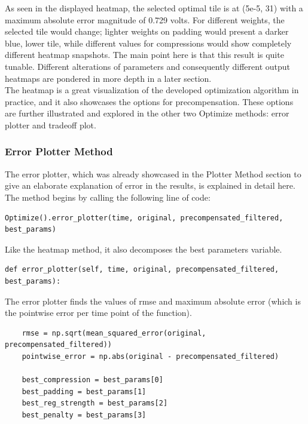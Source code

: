 \documentclass[11pt, a4paper]{article}
\theoremstyle{definition}
\numberwithin{equation}{section}
\begin{document}
As seen in the displayed heatmap, the selected optimal tile is at (5e-5, 31) with a maximum absolute error magnitude of 0.729 volts. For different weights, the selected tile would change; lighter weights on padding would present a darker blue, lower tile, while different values for compressions would show completely different heatmap snapshots. The main point here is that this result is quite tunable. Different alterations of parameters and consequently different output heatmaps are pondered in more depth in a later section.
\\
The heatmap is a great visualization of the developed optimization algorithm in practice, and it also showcases the options for precompensation. These options are further illustrated and explored in the other two Optimize methods: error plotter and tradeoff plot.

\subsubsection{Error Plotter Method}

The error plotter, which was already showcased in the Plotter Method section to give an elaborate explanation of error in the results, is explained in detail here.
\\
The method begins by calling the following line of code:

\begin{verbatim}
Optimize().error_plotter(time, original, precompensated_filtered, best_params)
\end{verbatim}

Like the heatmap method, it also decomposes the best parameters variable.

\begin{verbatim}
def error_plotter(self, time, original, precompensated_filtered, best_params):
\end{verbatim}

The error plotter finds the values of rmse and maximum absolute error (which is the pointwise error per time point of the function).

\begin{verbatim}
    rmse = np.sqrt(mean_squared_error(original, precompensated_filtered))
    pointwise_error = np.abs(original - precompensated_filtered)
            
    best_compression = best_params[0]
    best_padding = best_params[1]
    best_reg_strength = best_params[2]
    best_penalty = best_params[3]
\end{verbatim}
\end{document}
